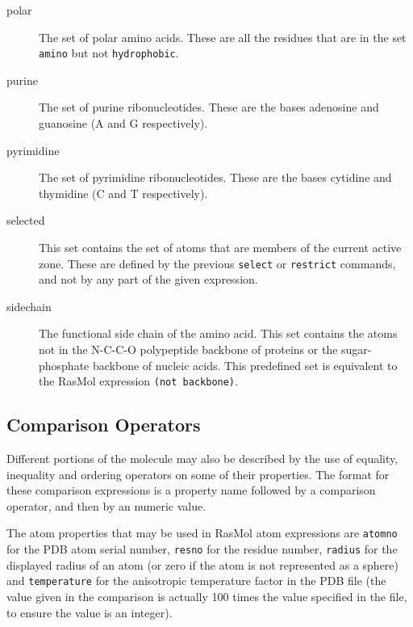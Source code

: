 \begin{description}
\item[polar]
The set of polar amino acids. These are all the residues that are in the
set {\tt amino} but not {\tt hydrophobic}.

\item[purine]
The set of purine ribonucleotides. These are the bases adenosine and
guanosine (A and G respectively).

\item[pyrimidine]
The set of pyrimidine ribonucleotides. These are the bases cytidine and
thymidine (C and T respectively).

\item[selected]
This set contains the set of atoms that are members of the current active
zone. These are defined by the previous {\tt select} or {\tt restrict}
commands, and not by any part of the given expression.


\item[sidechain]
The functional side chain of the amino acid. This set contains the atoms
not in the N-C-C-O polypeptide backbone of proteins or the sugar-phosphate
backbone of nucleic acids. This predefined set is equivalent to the RasMol
expression {\tt (not backbone)}.

\end{description}



\subsection{Comparison Operators}
\label{Operators}
Different portions of the molecule may also be described by the use of
equality, inequality and ordering operators on some of their properties.
The format for these comparison expressions is a property name followed
by a comparison operator, and then by an numeric value.

The atom properties that may be used in RasMol atom expressions are
{\tt atomno} for the PDB atom serial number, {\tt resno} for the residue
number, {\tt radius} for the displayed radius of an atom (or zero if the
atom is not represented as a sphere) and {\tt temperature} for the 
anisotropic temperature factor in the PDB file (the value given in the
comparison is actually 100 times the value specified in the file, to
ensure the value is an integer).


